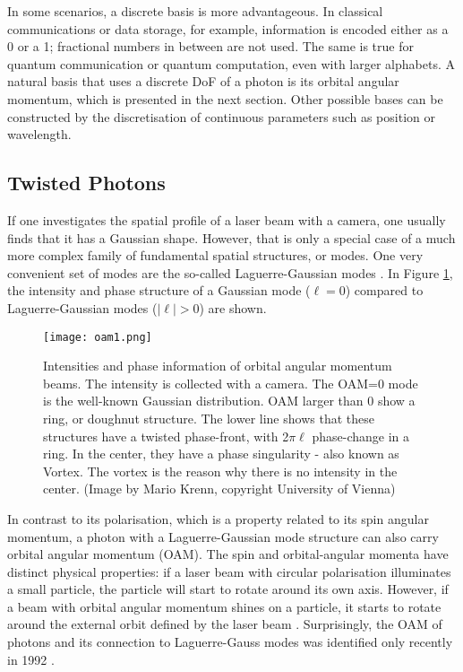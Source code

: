 \documentclass{article}
\begin{document}
In some scenarios, a discrete basis is more advantageous. In classical communications or data storage, for example, information is encoded either as a 0 or a 1; fractional numbers in between are not used. The same is true for quantum communication or quantum computation, even with larger alphabets. A natural basis that uses a discrete DoF of a photon is its orbital angular momentum, which is presented in the next section. Other possible bases can be constructed by the discretisation of continuous parameters such as position or wavelength. 

\subsection{Twisted Photons}
If one investigates the spatial profile of a laser beam with a camera, one usually finds that it has a Gaussian shape. However, that is only a special case of a much more complex family of fundamental spatial structures, or modes. One very convenient set of modes are the so-called Laguerre-Gaussian modes \cite{MolinaTerriza:2007ig,allen1999orbital,Yao:2011ve}. In Figure \ref{fig:OAMint}, the intensity and phase structure of a Gaussian mode ($\ell=0$) compared to Laguerre-Gaussian modes ($|\ell|>0$) are shown.

\begin{figure}[h!]
\centering
\texttt{[image: oam1.png]}
\caption{Intensities and phase information of orbital angular momentum beams. The intensity is collected with a camera. The OAM=0 mode is the well-known Gaussian distribution. OAM larger than 0 show a ring, or doughnut structure. The lower line shows that these structures have a twisted phase-front, with 2$\pi\ell$ phase-change in a ring. In the center, they have a phase singularity - also known as Vortex. The vortex is the reason why there is no intensity in the center. (Image by Mario Krenn, copyright University of Vienna)}
\label{fig:OAMint}
\end{figure}

In contrast to its polarisation, which is a property related to its spin angular momentum, a photon with a Laguerre-Gaussian mode structure can also carry orbital angular momentum (OAM). The spin and orbital-angular momenta have distinct physical properties: if a laser beam with circular polarisation illuminates a small particle, the particle will start to rotate around its own axis. However, if a beam with orbital angular momentum shines on a particle, it starts to rotate around the external orbit defined by the laser beam \cite{he1995direct}. Surprisingly, the OAM of photons and its connection to Laguerre-Gauss modes was identified only recently in 1992 \cite{Allen:1992by}.
\end{document}
